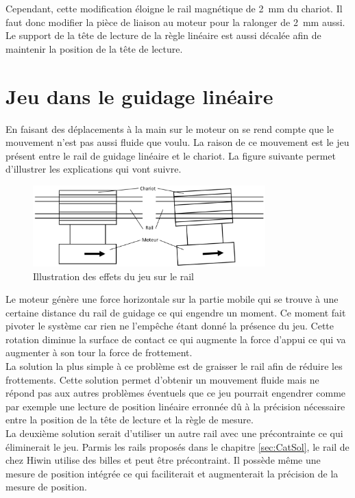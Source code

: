 Cependant, cette modification éloigne le rail magnétique de 2~mm du chariot. Il faut donc modifier la pièce de liaison au moteur pour la ralonger
de 2~mm aussi. Le support de la tête de lecture de la règle linéaire est aussi décalée afin de maintenir la position de la tête de lecture.

\section{Jeu dans le guidage linéaire}\label{sec:JeuGuidage}
En faisant des déplacements à la main sur le moteur on se rend compte que le mouvement n'est pas aussi fluide que voulu. La raison de ce mouvement
est le jeu présent entre le rail de guidage linéaire et le chariot. La figure suivante permet d'illustrer les explications qui vont suivre.

\begin{figure}[H]
    \centering
    \includegraphics[width = 0.8\textwidth]{assets/figures/ImprevuJeuRail.svg}
    \caption{Illustration des effets du jeu sur le rail}
    \label{fig:JeuRail}
\end{figure}

Le moteur génère une force horizontale sur la partie mobile qui se trouve à une certaine distance du rail de guidage ce qui engendre un moment.
Ce moment fait pivoter le système car rien ne l'empêche étant donné la présence du jeu. Cette rotation diminue la surface de contact ce qui
augmente la force d'appui ce qui va augmenter à son tour la force de frottement.\\

La solution la plus simple à ce problème est de graisser le rail afin de réduire les frottements. Cette solution permet d'obtenir un mouvement
fluide mais ne répond pas aux autres problèmes éventuels que ce jeu pourrait engendrer comme par exemple une lecture de position linéaire
erronnée dû à la précision nécessaire entre la position de la tête de lecture et la règle de mesure.\\

La deuxième solution serait d'utiliser un autre rail avec une précontrainte ce qui éliminerait le jeu. Parmis les rails proposés dans le
chapitre \ref{sec:CatSol}, le rail de chez Hiwin \cite{Hiwin} utilise des billes et peut être précontraint. Il possède même une mesure de
position intégrée ce qui faciliterait et augmenterait la précision de la mesure de position.\\

